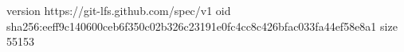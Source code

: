 version https://git-lfs.github.com/spec/v1
oid sha256:eeff9c140600ceb6f350c02b326c23191e0fc4cc8c426bfac033fa44ef58e8a1
size 55153
